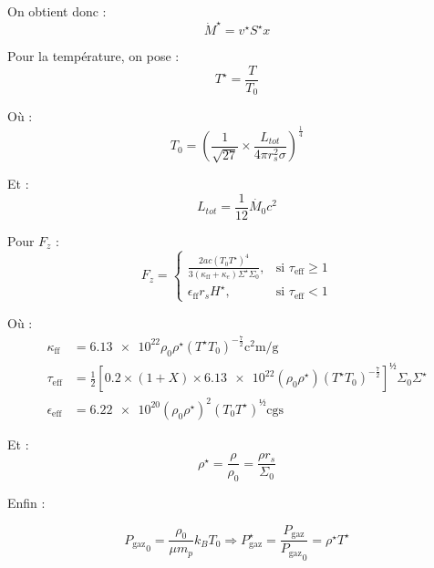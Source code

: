 On obtient donc :
\begin{equation}
    \dot{M}^\star = v^\star S^\star x
\end{equation}

Pour la température, on pose :
\begin{equation}
    T^{\star} = \frac{T}{T_0}
\end{equation}

Où :
\begin{equation}
    T_0 = \left(\frac{1}{\sqrt{27}} × \frac{L_{tot}}{4 \pi r_s^2 \sigma} \right)^{\frac{1}{4}}
\end{equation}

Et :
\begin{equation}
    L_{tot} = \frac{1}{12} \dot{M_0} c^2
\end{equation}

Pour $F_z$ :
\begin{equation}
    F_z =
    \begin{cases}
        \frac{2 a c \left(T_0 T^\star\right)^4}{3 (\kappa_\mathrm{ff} + \kappa_e)\Sigma^\star \Sigma_0}, &\text{si $\tau_\mathrm{eff} \geq 1$} \\
        \epsilon_\mathrm{ff} r_s H^\star, &\text{si $\tau_\mathrm{eff} < 1$}
    \end{cases}
\end{equation}

Où :
\begin{align}
    \kappa_\mathrm{ff} &= \num{6.13e22} \rho_0 \rho^\star \left(T^\star T_0\right)^{-\frac{7}{2}} \si{\square\centi\meter\per\gram} \\
    \tau_\mathrm{eff} &= \frac{1}{2} \left[ \num{0.2} × (1 + X) × \num{6.13e22} \left(\rho_0 \rho^\star\right) \left(T^\star T_0\right)^{-\frac{7}{2}} \right]^½ \Sigma_0 \Sigma^\star \\
    \epsilon_\mathrm{eff} &= \num{6.22e20} (\rho_0 \rho^\star)^2 (T_0 T^\star)^½ \text{cgs}
\end{align}

Et :
\begin{equation}
    \rho^\star = \frac{\rho}{\rho_0} = \frac{\rho r_s}{\Sigma_0}
\end{equation}

Enfin :

\begin{equation}
    {P_\mathrm{gaz}}_0 = \frac{\rho_0}{\mu m_p} k_B T_0 \Rightarrow P_\mathrm{gaz}^\star = \frac{P_\mathrm{gaz}}{{P_\mathrm{gaz}}_0} = \rho^\star T^\star
\end{equation}

